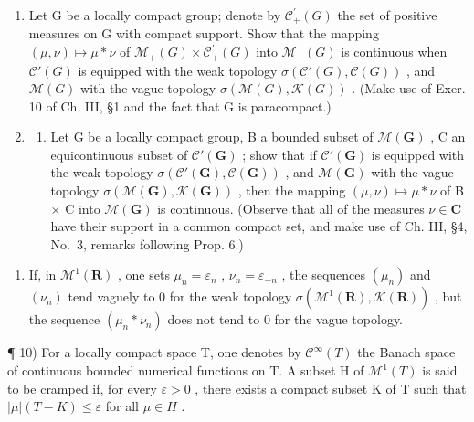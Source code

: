 \begin{enumerate}
\def\labelenumi{\arabic{enumi})}
\setcounter{enumi}{7}
\item
  Let G be a locally compact group; denote by \(\mathcal{C}_{+}^{\prime}(G)\) the set of positive measures on G with compact support. Show that the mapping \((\mu, \nu) \mapsto \mu * \nu\) of \(\mathcal{M}_{+}(G) \times \mathcal{C}_{+}^{\prime}(G)\) into \(\mathcal{M}_{+}(G)\) is continuous when \(\mathcal{C}'(G)\) is equipped with the weak topology \(\sigma(\mathcal{C}'(G), \mathcal{C}(G))\) , and \(\mathcal{M}(G)\) with the vague topology \(\sigma(\mathcal{M}(G), \mathcal{K}(G))\) . (Make use of Exer. 10 of Ch. III, §1 and the fact that G is paracompact.)
\item
  \begin{enumerate}
  \def\labelenumii{\alph{enumii})}
  \tightlist
  \item
    Let G be a locally compact group, B a bounded subset of \(\mathcal{M}(\mathbf{G})\) , C an equicontinuous subset of \(\mathcal{C}'(\mathbf{G})\) ; show that if \(\mathcal{C}'(\mathbf{G})\) is equipped with the weak topology \(\sigma(\mathcal{C}'(\mathbf{G}), \mathcal{C}(\mathbf{G}))\) , and \(\mathcal{M}(\mathbf{G})\) with the vague topology \(\sigma(\mathcal{M}(\mathbf{G}), \mathcal{K}(\mathbf{G}))\) , then the mapping \((\mu, \nu) \mapsto \mu * \nu\) of B × C into \(\mathcal{M}(\mathbf{G})\) is continuous. (Observe that all of the measures \(\nu \in \mathbf{C}\) have their support in a common compact set, and make use of Ch. III, §4, No.~3, remarks following Prop. 6.)
  \end{enumerate}
\end{enumerate}

\begin{enumerate}
\def\labelenumi{\alph{enumi})}
\setcounter{enumi}{1}
\tightlist
\item
  If, in \(\mathcal{M}^1 (\mathbf{R})\) , one sets \(\mu_n = \varepsilon_n\) , \(\nu_{n} = \varepsilon_{-n}\) , the sequences \((\mu_n)\) and \((\nu_{n})\) tend vaguely to 0 for the weak topology \(\sigma (\mathcal{M}^1 (\mathbf{R}),\overline{\mathcal{K}(\mathbf{R})})\) , but the sequence \((\mu_n*\nu_n)\) does not tend to 0 for the vague topology.
\end{enumerate}

¶ 10) For a locally compact space T, one denotes by \(\mathcal{C}^{\infty}(T)\) the Banach space of continuous bounded numerical functions on T. A subset H of \(\mathcal{M}^{1}(T)\) is said to be cramped if, for every \(\varepsilon > 0\) , there exists a compact subset K of T such that \(|\mu|(T - K) \leqslant \varepsilon\) for all \(\mu \in H\) .

